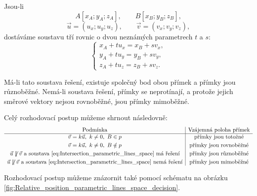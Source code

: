 Jsou-li
\[
    A[x_A;y_A;z_A],
    \qquad
    B[x_B;y_B;z_B],
\]
\[
    \vec{u}=(u_x;u_y;u_z),
    \qquad
    \vec{v}=(v_x;v_y;v_z),
\]
dostáváme soustavu tří rovnic o dvou neznámých parametrech $t$ a $s$:
\begin{equation}
    \begin{cases}
        x_A+t u_x=x_B+s v_x,\\
        y_A+t u_y=y_B+s v_y,\\
        z_A+t u_z=z_B+s v_z.
    \end{cases}
    \label{eq:Intersection_parametric_lines_space}
\end{equation}

Má-li tato soustava řešení, existuje společný bod obou přímek
a přímky jsou různoběžné. Nemá-li soustava řešení, přímky se
neprotínají, a protože jejich směrové vektory nejsou rovnoběžné,
jsou přímky mimoběžné.

Celý rozhodovací postup můžeme shrnout následovně:
\[
\begin{array}{c|c}
\text{Podmínka}
&
\text{Vzájemná poloha přímek}
\\
\hline
\vec{v}=k\vec{u},\ k\neq0,\ B\in p
&
\text{přímky jsou totožné}
\\[1mm]
\vec{v}=k\vec{u},\ k\neq0,\ B\notin p
&
\text{přímky jsou rovnoběžné}
\\[1mm]
\vec{u}\not\parallel\vec{v}
\text{ a soustava \eqref{eq:Intersection_parametric_lines_space} má řešení}
&
\text{přímky jsou různoběžné}
\\[1mm]
\vec{u}\not\parallel\vec{v}
\text{ a soustava \eqref{eq:Intersection_parametric_lines_space} nemá řešení}
&
\text{přímky jsou mimoběžné}
\end{array}
\]

Rozhodovací postup můžeme znázornit také pomocí schématu na obrázku
\ref{fig:Relative_position_parametric_lines_space_decision}.

